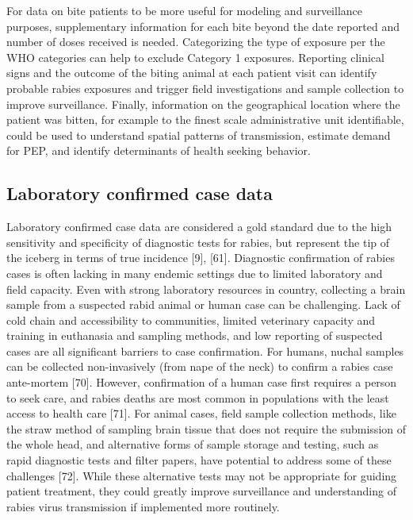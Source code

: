 \documentclass[
]{book}
\begin{document}
For data on bite patients to be more useful for modeling and
surveillance purposes, supplementary information for each bite beyond
the date reported and number of doses received is needed. Categorizing
the type of exposure per the WHO categories can help to exclude Category
1 exposures. Reporting clinical signs and the outcome of the biting
animal at each patient visit can identify probable rabies exposures and
trigger field investigations and sample collection to improve
surveillance. Finally, information on the geographical location where
the patient was bitten, for example to the finest scale administrative
unit identifiable, could be used to understand spatial patterns of
transmission, estimate demand for PEP, and identify determinants of
health seeking behavior.

\hypertarget{laboratory-confirmed-case-data}{%
\subsection{Laboratory confirmed case data}\label{laboratory-confirmed-case-data}}

Laboratory confirmed case data are considered a gold standard due to the
high sensitivity and specificity of diagnostic tests for rabies, but
represent the tip of the iceberg in terms of true incidence {[}9{]},
{[}61{]}. Diagnostic confirmation of rabies cases is often lacking in many
endemic settings due to limited laboratory and field capacity. Even with
strong laboratory resources in country, collecting a brain sample from a
suspected rabid animal or human case can be challenging. Lack of cold
chain and accessibility to communities, limited veterinary capacity and
training in euthanasia and sampling methods, and low reporting of
suspected cases are all significant barriers to case confirmation. For
humans, nuchal samples can be collected non-invasively (from nape of the
neck) to confirm a rabies case ante-mortem {[}70{]}. However, confirmation
of a human case first requires a person to seek care, and rabies deaths
are most common in populations with the least access to health care
{[}71{]}. For animal cases, field sample collection methods, like the
straw method of sampling brain tissue that does not require the
submission of the whole head, and alternative forms of sample storage
and testing, such as rapid diagnostic tests and filter papers, have
potential to address some of these challenges {[}72{]}. While these
alternative tests may not be appropriate for guiding patient treatment,
they could greatly improve surveillance and understanding of rabies
virus transmission if implemented more routinely.
\end{document}
